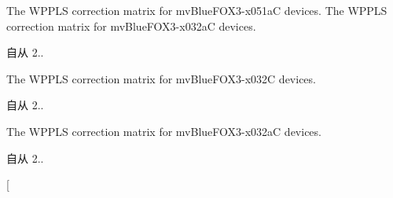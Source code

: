 \begin{Desc}
\begin{description}
\item[{\em 
\hypertarget{group___common_interface_gga514bdc683ef27995fdeba04aec25f571adf4e1149e6eb2e7a16d84e6c7c5549b0}{cticmm\+Blue\+F\+O\+X3\+\_\+x051a\+C\+\_\+\+W\+P\+P\+L\+S}\label{group___common_interface_gga514bdc683ef27995fdeba04aec25f571adf4e1149e6eb2e7a16d84e6c7c5549b0}
}]The W\+P\+P\+L\+S correction matrix for mv\+Blue\+F\+O\+X3-\/x051a\+C devices. The W\+P\+P\+L\+S correction matrix for mv\+Blue\+F\+O\+X3-\/x032a\+C devices. \begin{DoxySince}{自从}
2.. 
\end{DoxySince}
\item[{\em 
\hypertarget{group___common_interface_gga514bdc683ef27995fdeba04aec25f571ad6a7930858b2e9e0decf95e9fecbac63}{cticmm\+Blue\+F\+O\+X3\+\_\+x032\+C\+\_\+\+W\+P\+P\+L\+S}\label{group___common_interface_gga514bdc683ef27995fdeba04aec25f571ad6a7930858b2e9e0decf95e9fecbac63}
}]The W\+P\+P\+L\+S correction matrix for mv\+Blue\+F\+O\+X3-\/x032\+C devices. \begin{DoxySince}{自从}
2.. 
\end{DoxySince}
\item[{\em 
\hypertarget{group___common_interface_gga514bdc683ef27995fdeba04aec25f571a4cf22b2055d24cc0b02b5e3d4104ed1a}{cticmm\+Blue\+F\+O\+X3\+\_\+x032a\+C\+\_\+\+W\+P\+P\+L\+S}\label{group___common_interface_gga514bdc683ef27995fdeba04aec25f571a4cf22b2055d24cc0b02b5e3d4104ed1a}
}]The W\+P\+P\+L\+S correction matrix for mv\+Blue\+F\+O\+X3-\/x032a\+C devices. \begin{DoxySince}{自从}
2.. 
\end{DoxySince}
\item[{\em 
}
\end{description}
\end{Desc}
